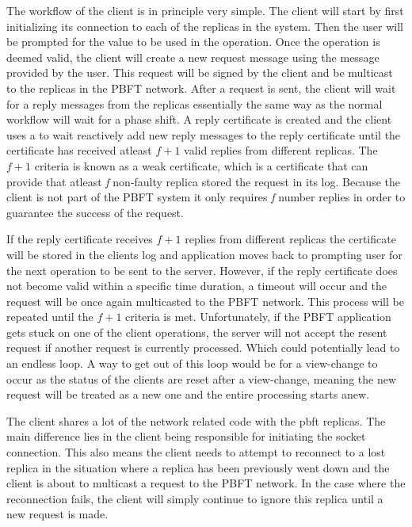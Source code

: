 The workflow of the client is in principle very simple. The client will start by first initializing its connection to each of the replicas in the system. Then the user will be prompted for the value to be used in the operation. Once the operation is deemed valid, the client will create a new request message using the message provided by the user. This request will be signed by the client and be multicast to the replicas in the PBFT network. After a request is sent, the client will wait for a reply messages from the replicas essentially the same way as  the normal workflow will wait for a phase shift. A reply certificate is created and the client uses a  to wait reactively add new reply messages to the reply certificate until the certificate has received atleast $f+1$ valid replies from different replicas. The $f+1$ criteria is known as a weak certificate, which is a certificate that can provide that atleast \emph{f} non-faulty replica stored the request in its log\cites[p.~9]{PAPER:PBFTRecovery}[p.~2]{PAPER:DPBFT}. Because the client is not part of the PBFT system it only requires \emph{f} number replies in order to guarantee the success of the request\cites[p.~3]{PAPER:OGPBFT}[p.~9]{PAPER:PBFTRecovery}. 

If the reply certificate receives $f+1$ replies from different replicas the certificate will be stored in the clients log and application moves back to prompting user for the next operation to be sent to the server. However, if the reply certificate does not become valid within a specific time duration, a timeout will occur and the request will be once again multicasted to the PBFT network. This process will be repeated until the $f+1$ criteria is met. Unfortunately, if the PBFT application gets stuck on one of the client operations, the server will not accept the resent request if another request is currently processed. Which could potentially lead to an endless loop. A way to get out of this loop would be for a view-change to occur as the status of the clients are reset after a view-change, meaning the new request will be treated as a new one and the entire processing starts anew. 

The client shares a lot of the network related code with the pbft replicas. The main difference lies in the client being responsible for initiating the socket connection. This also means the client needs to attempt to reconnect to a lost replica in the situation where a replica has been previously went down and the client is about to multicast a request to the PBFT network. In the case where the reconnection fails, the client will simply continue to ignore this replica until a new request is made.


